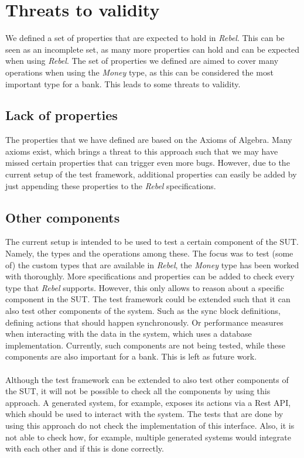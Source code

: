 \section{Threats to validity}
We defined a set of properties that are expected to hold in \textit{Rebel}. This can be seen as an incomplete set, as many more properties can hold and can be expected when using \textit{Rebel}. The set of properties we defined are aimed to cover many operations when using the \textit{Money} type, as this can be considered the most important type for a bank. This leads to some threats to validity.

\subsection*{Lack of properties}
The properties that we have defined are based on the Axioms of Algebra. Many axioms exist, which brings a threat to this approach such that we may have missed certain properties that can trigger even more bugs. However, due to the current setup of the test framework, additional properties can easily be added by just appending these properties to the \textit{Rebel} specifications.

\subsection*{Other components}
The current setup is intended to be used to test a certain component of the SUT. Namely, the types and the operations among these. The focus was to test (some of) the custom types that are available in \textit{Rebel}, the \textit{Money} type has been worked with thoroughly. More specifications and properties can be added to check every type that \textit{Rebel} supports. However, this only allows to reason about a specific component in the SUT. The test framework could be extended such that it can also test other components of the system. Such as the sync block definitions, defining actions that should happen synchronously. Or performance measures when interacting with the data in the system, which uses a database implementation. Currently, such components are not being tested, while these components are also important for a bank. This is left as future work.\\
\\
Although the test framework can be extended to also test other components of the SUT, it will not be possible to check all the components by using this approach. A generated system, for example, exposes its actions via a Rest API, which should be used to interact with the system. The tests that are done by using this approach do not check the implementation of this interface. Also, it is not able to check how, for example, multiple generated systems would integrate with each other and if this is done correctly.

